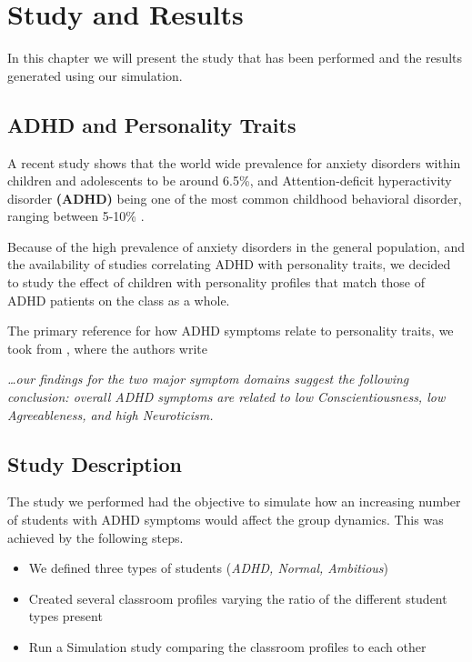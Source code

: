\chapter{Study and Results}
In this chapter we will present the study that has been performed and the results
generated using our simulation.

\section{ADHD and Personality Traits}
A recent study \cite{Polanczyk2015} shows that the world wide prevalence
for anxiety disorders within children and adolescents to be around 6.5\%, and 
Attention-deficit hyperactivity disorder \textbf{(ADHD)}\cite{Barkley1997} being one
of the most common childhood behavioral disorder, ranging between 5-10\% \cite{Sayal2018}.

\bb

Because of the high prevalence of anxiety disorders in the general population,
and the availability of studies correlating ADHD with personality traits, we
decided to study the effect of children with personality profiles that match those
of ADHD patients on the class as a whole.

\bb

The primary reference for how ADHD symptoms relate to personality traits, we took
from \cite{Nigg2002}, where the authors write

\textit{\dots our findings for the two major symptom domains suggest the following
conclusion: overall ADHD symptoms are related to low Conscientiousness, low Agreeableness, and high Neuroticism.}

\section{Study Description}
The study we performed had the objective to simulate how an increasing number of
students with ADHD symptoms would affect the group dynamics. This was achieved by
the following steps.

\begin{itemize}
    \item We defined three types of students (\textit{ADHD, Normal, Ambitious})
    \item Created several classroom profiles varying the ratio of the different student types present
    \item Run a Simulation study comparing the classroom profiles to each other
\end{itemize}

